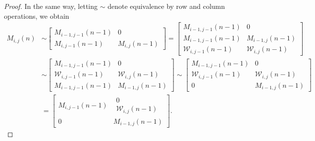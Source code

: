 \documentclass[11pt]{article}
\theoremstyle{definition}
\numberwithin{equation}{section}
\numberwithin{equation}{section}
\newcommand{\W}{\mathcal{W}}
\begin{document}
\begin{proof}
In the same way, letting $\sim$ denote equivalence by row and column operations, we obtain 
\begin{align*}
M_{i,j}(n) &\sim \left [ \begin{array}{c|c}
M_{i-1,j-1}(n-1) & 0 \\
\hline
\hline
M_{i,j-1}(n-1) & M_{i,j}(n-1)
\end{array} \right ] 
= \left [ \begin{array}{c|c}
M_{i-1,j-1}(n-1) & 0\\
\hline
\hline
M_{i-1,j-1}(n-1) & M_{i-1,j}(n-1)\\
\hline
\W_{i,j-1}(n-1) & \W_{i,j}(n-1) 
\end{array} \right ] \\
&\sim \left [ \begin{array}{c|c}
M_{i-1,j-1}(n-1) & 0\\
\hline
\hline
\W_{i,j-1}(n-1) & \W_{i,j}(n-1) \\
\hline
M_{i-1,j-1}(n-1) & M_{i-1,j}(n-1)
\end{array} \right ] 
\sim \left [ \begin{array}{c|c}
M_{i-1,j-1}(n-1) & 0\\
\hline
\hline
\W_{i,j-1}(n-1) & \W_{i,j}(n-1) \\
\hline
0 & M_{i-1,j}(n-1)
\end{array} \right ] \\
&= \left [ \begin{array}{c|c}
M_{i,j-1}(n-1) & 
\begin{array}{c}
0 \\
\hline
\W_{i,j}(n-1) \end{array}
\\
\hline
\hline
0 & M_{i-1,j}(n-1)
\end{array} \right ].
\end{align*}


\end{proof}
\end{document}
